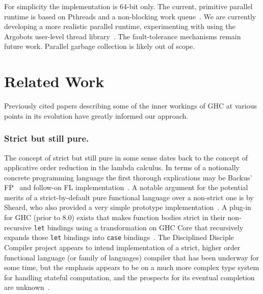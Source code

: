 \documentclass{llncs}
\begin{document}

For simplicity the implementation is 64-bit only.
%
The current, primitive parallel runtime is based on Pthreads and a non-blocking
work queue~\cite{Michael:1996}.  We are currently developing a more realistic
parallel runtime, experimenting with using the Argobots user-level thread library~\cite{Seo:2015}.
%
The fault-tolerance mechanisms remain future work.
%
Parallel garbage collection is likely out of scope.





\section{Related Work}

Previously cited papers describing some of the inner workings of GHC at
various points in its evolution have greatly informed our approach.

\subsubsection{Strict but still pure.}
The concept of strict but still pure in some sense dates back to the concept
of applicative order reduction in the lambda calculus.  In terms of a
notionally concrete programming language the first thorough explications may
be Backus' FP~\cite{Backus:1978} and follow-on FL
implementation~\cite{AikenFL,FLreport89}.
%
A notable argument for the potential merits of a strict-by-default
pure functional language over a non-strict one is by Sheard, who also provided
a very simple prototype implementation~\cite{Sheard:2003}.
%
A plug-in for GHC (prior to 8.0) exists that makes function bodies strict in
their non-recursive \texttt{let} bindings using a transformation on GHC Core
that recursively expands those \texttt{let} bindings into \texttt{case}
bindings~\cite{Bolingbroke:2008,strict-ghc-plugin}.
%
The Disciplined Disciple Compiler project appears to intend implementation of
a strict, higher order functional language (or family of languages) compiler
that has been underway for some time, but the emphasis appears to be on a much
more complex type system for handling stateful computation, and the prospects
for its eventual completion are unknown~\cite{disciplined-disciple}.
\end{document}
